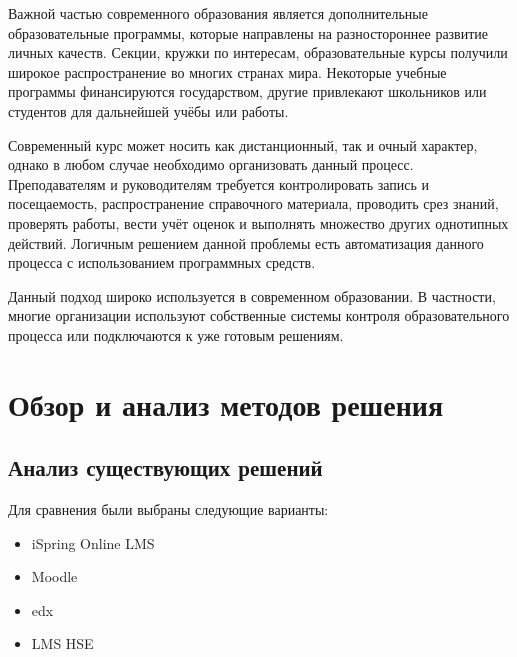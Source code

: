 \documentclass[a4paper,14pt]{article}
\begin{document}
Важной частью современного образования является дополнительные образовательные программы, которые направлены на разностороннее развитие личных качеств.
Секции, кружки по интересам, образовательные курсы получили широкое распространение во многих странах мира.
Некоторые учебные программы финансируются государством, другие привлекают школьников или студентов для дальнейшей учёбы или работы.

Современный курс может носить как дистанционный, так и очный характер, однако в любом случае необходимо организовать данный процесс.
Преподавателям и руководителям требуется контролировать запись и посещаемость, распространение справочного материала, проводить срез знаний, проверять работы, вести учёт оценок и выполнять множество других однотипных действий.
Логичным решением данной проблемы есть автоматизация данного процесса с использованием программных средств.

Данный подход широко используется в современном образовании. В частности, многие организации используют собственные системы контроля образовательного процесса или подключаются к уже готовым решениям.








\section{Обзор и анализ методов решения}

\subsection{Анализ существующих решений}


Для сравнения были выбраны следующие варианты:

\begin{itemize}
	\item iSpring Online LMS
	\item Moodle	
	\item edx
	\item LMS HSE
	
\end{itemize}
\end{document}
